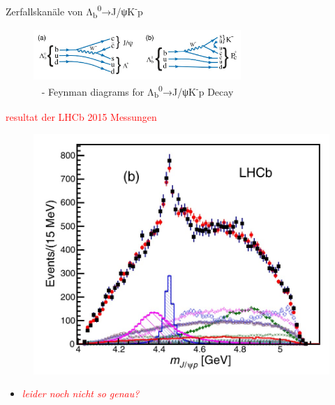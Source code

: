 \documentclass[aspectratio=169]{beamer} %
\begin{document}
    \begin{frame}{Zerfallskanäle von Λ\textsubscript{b}\textsuperscript{0}→J/ψK\textsuperscript{-}p}
      \begin{figure}\includegraphics[width=0.7\textwidth]{Images/98cb82e8-f82b-43ad-8d90-3c7881558f42.jpg}\caption{~\protect\cite[S.~1]{Aaij.2015} - Feynman diagrams for Λ\textsubscript{b}\textsuperscript{0}→J/ψK\textsuperscript{-}p Decay}
        \end{figure}
    \end{frame}



    \begin{frame}{\textcolor{red}{resultat der LHCb 2015 Messungen}}
      \begin{figure}\includegraphics[width=\textwidth, height=0.6\textheight, keepaspectratio]{Images/f4773e9d-39b6-4dc8-8301-4f91e5c718c3.jpg}%
        \\\protect\cite[S.~2]{Aaij.2015}\end{figure}
      \begin{itemize}
        \item \emph{\textcolor{red}{leider noch nicht so genau?}}
      \end{itemize}
    \end{frame}
\end{document}

